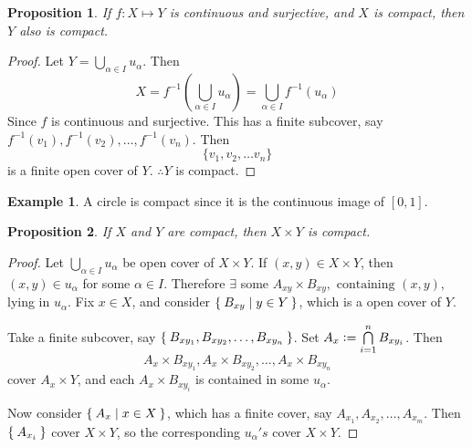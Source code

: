 \documentclass[12pt]{amsart}
\theoremstyle{plain}
\newtheorem*{prop}{Proposition}
\theoremstyle{remark}
\theoremstyle{definition}
\newtheorem*{eg}{Example}
\begin{document}
\begin{prop}
If $f:X\mapsto Y$ is continuous and surjective, and $X$ is compact, then $Y$ also is compact.
\end{prop}
\begin{proof}
Let $Y = \bigcup\limits_{\alpha \in I} u_{\alpha}$. Then 
\begin{equation*}
X = f^{-1}\left(\bigcup\limits_{\alpha \in I} u_{\alpha}\right) = \bigcup\limits_{\alpha \in I}f^{-1}(u_{\alpha})
\end{equation*}
Since $f$ is continuous and surjective.
This has a finite subcover, say $f^{-1}(v_1),f^{-1}(v_2),\dots ,f^{-1}(v_n)$. Then 
\begin{equation*}
\{v_1, v_2, \dots v_n\}
\end{equation*}
is a finite open cover of $Y$. $\therefore  Y$ is compact.
\end{proof}
\begin{eg}
A circle is compact since it is the continuous image of $[0, 1]$.
\end{eg}

\begin{prop}
If $X$ and $Y$ are compact, then $X \times Y$ is compact.
\end{prop}
\begin{proof}
Let $\bigcup\limits_{\alpha \in I} u_{\alpha}$ be open cover of $X  \times Y $. If $(x, y) \in X \times Y$, then $(x, y) \in u_{\alpha}$ for some $\alpha \in I$. Therefore $\exists$ some $A_{xy} \times B_{xy}, \mbox{ containing } (x,y)$, lying in $u_{\alpha}$. 
Fix $x\in X$, and consider $\Set{B_{xy}|y \in Y}$, which is a open cover of $Y$.
\par
Take a finite subcover, say $\Set{B_{xy_1},B_{xy_2}, \dots, B_{xy_n}}$. Set $A_x \vcentcolon = \bigcap\limits_{i=1}^{n}B_{xy_i}$. Then 
\begin{equation*}
A_x \times B_{xy_1},A_x \times B_{xy_2},\dots,A_x \times B_{xy_n}
\end{equation*}
cover $A_x \times Y$, and each $A_x \times B_{xy_i}$ is contained in some $u_{\alpha}$.
\par
Now consider $\Set{A_x|x\in X}$, which has a finite cover, say $A_{x_1},A_{x_2}, \dots, A_{x_m}$. Then $\Set{A_{x_i}}$ cover $X \times Y$, so the corresponding $u_{\alpha} 's$ cover $X \times Y$.
\end{proof}
\end{document}
